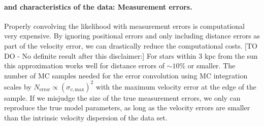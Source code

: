 \paragraph{\RM and characteristics of the data: Measurement errors.} Properly convolving the likelihood with measurement errors is computational very expensive. By ignoring positional errors and only including distance errors as part of the velocity error, we can drastically reduce the computational costs. [TO DO - No definite result after this disclaimer:] For stars within 3 kpc from the sun this approximation works well for distance errors of $\sim 10\%$ or smaller. The number of MC samples needed for the error convolution using MC integration scales by $N_\text{error} \propto (\sigma_{v,\text{max}})^2$ with the maximum velocity error at the edge of the sample. If we misjudge the size of the true measurement errors, we only can reproduce the true model parameters, as long as the velocity errors are smaller than the intrinsic velocity dispersion of the data set.

